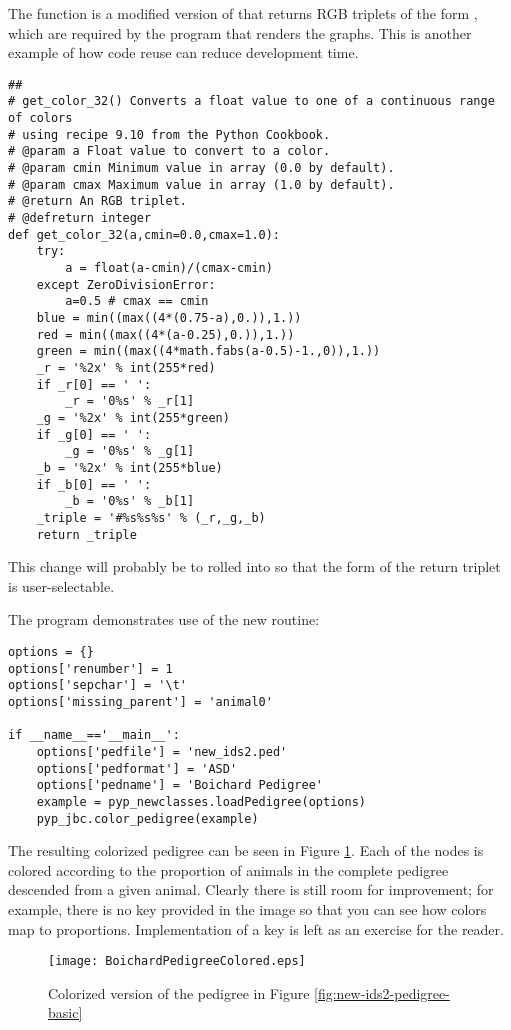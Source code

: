 The  function is a modified version of  that returns RGB triplets of the form , which are required by the program that renders the graphs.  This is another example of how code reuse can reduce development time.
\begin{verbatim}
##
# get_color_32() Converts a float value to one of a continuous range of colors
# using recipe 9.10 from the Python Cookbook.
# @param a Float value to convert to a color.
# @param cmin Minimum value in array (0.0 by default).
# @param cmax Maximum value in array (1.0 by default).
# @return An RGB triplet.
# @defreturn integer
def get_color_32(a,cmin=0.0,cmax=1.0):
    try:
        a = float(a-cmin)/(cmax-cmin)
    except ZeroDivisionError:
        a=0.5 # cmax == cmin
    blue = min((max((4*(0.75-a),0.)),1.))
    red = min((max((4*(a-0.25),0.)),1.))
    green = min((max((4*math.fabs(a-0.5)-1.,0)),1.))
    _r = '%2x' % int(255*red)
    if _r[0] == ' ':
        _r = '0%s' % _r[1]
    _g = '%2x' % int(255*green)
    if _g[0] == ' ':
        _g = '0%s' % _g[1]
    _b = '%2x' % int(255*blue)
    if _b[0] == ' ':
        _b = '0%s' % _b[1]
    _triple = '#%s%s%s' % (_r,_g,_b)
    return _triple
\end{verbatim}
This change will probably be to rolled into  so that the form of the return triplet is user-selectable.

The program  demonstrates use of the new  routine:
\begin{verbatim}
options = {}
options['renumber'] = 1
options['sepchar'] = '\t'
options['missing_parent'] = 'animal0'

if __name__=='__main__':
    options['pedfile'] = 'new_ids2.ped'
    options['pedformat'] = 'ASD'
    options['pedname'] = 'Boichard Pedigree'
    example = pyp_newclasses.loadPedigree(options)
    pyp_jbc.color_pedigree(example)
\end{verbatim}
The resulting colorized pedigree can be seen in Figure \ref{fig:boichard2-pedigree-colorized}.  Each of the nodes is colored
according to the proportion of animals in the complete pedigree descended from a given animal.  Clearly there is still room
for improvement; for example, there is no key provided in the image so that you can see how colors map to proportions.  Implementation
of a key is left as an exercise for the reader.
\begin{figure}
  \begin{center}
    \texttt{[image: BoichardPedigreeColored.eps]}
    \caption{Colorized version of the pedigree in Figure \ref{fig:new-ids2-pedigree-basic}}
    \label{fig:boichard2-pedigree-colorized}
  \end{center}
\end{figure}
